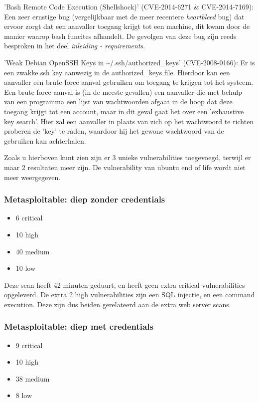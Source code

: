 'Bash Remote Code Execution (Shellshock)' (CVE-2014-6271 \& CVE-2014-7169): Een zeer ernstige bug (vergelijkbaar met de meer recentere \textit{heartbleed} bug) dat ervoor zorgt dat een aanvaller toegang krijgt tot een machine, dit kwam door de manier waarop bash funcites afhandelt. De gevolgen van deze bug zijn reeds besproken in het deel \textit{inleiding - requirements}.

'Weak Debian OpenSSH Keys in \textasciitilde/.ssh/authorized\_keys' (CVE-2008-0166): Er is een zwakke ssh key aanwezig in de authorized\_keys file. Hierdoor kan een aanvaller een brute-force aanval gebruiken om toegang te krijgen tot het systeem. Een brute-force aanval is (in de meeste gevallen) een aanvaller die met behulp van een programma een lijst van wachtwoorden afgaat in de hoop dat deze toegang krijgt tot een account, maar in dit geval gaat het over een 'exhaustive key search'. Hier zal een aanvaller in plaats van zich op het wachtwoord te richten proberen de 'key' te raden, waardoor hij het gewone wachtwoord van de gebruiken kan achterhalen.

Zoals u hierboven kunt zien zijn er 3 unieke vulnerabilities toegevoegd, terwijl er maar 2 resultaten meer zijn. De vulnerability van ubuntu end of life wordt niet meer weergegeven.

\subsubsection{Metasploitable: diep zonder credentials}

\begin{itemize}
\item 6 critical
\item 10 high
\item 40 medium
\item 10 low
\end{itemize}

Deze scan heeft 42 minuten geduurt, en heeft geen extra critical vulnerabilities opgeleverd. De extra 2 high vulnerabilities zijn een SQL injectie, en een command execution. Deze zijn dus beiden gerelateerd aan de extra web server scans.

\subsubsection{Metasploitable: diep met credentials}

\begin{itemize}
\item 9 critical
\item 10 high
\item 38 medium
\item 8 low
\end{itemize}


